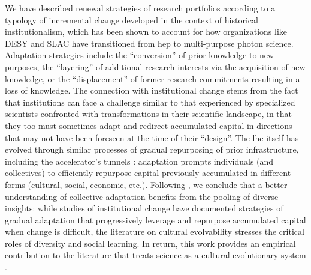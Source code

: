 \documentclass{article}
\begin{document}
We have described renewal strategies of research portfolios according to a typology of incremental change developed in the context of historical institutionalism, which has been shown to account for how organizations like DESY and SLAC have transitioned from \gls{hep} to multi-purpose photon science. Adaptation strategies include the ``conversion'' of prior knowledge to new purposes, the ``layering'' of additional research interests via the acquisition of new knowledge, or the ``displacement'' of former research commitments resulting in a loss of knowledge. The connection with institutional change stems from the fact that institutions can face a challenge similar to that experienced by specialized scientists confronted with transformations in their scientific landscape, in that they too must sometimes adapt and redirect accumulated capital in directions that may not have been foreseen at the time of their ``design''. The \gls{lhc} itself has evolved through similar processes of gradual repurposing of prior infrastructure, including the accelerator's tunnels \citep{Smith2015}: adaptation prompts individuals (and collectives) to efficiently repurpose capital previously accumulated in different forms (cultural, social, economic, etc.). Following \citealt{Galesic2023}, we conclude that a better understanding of collective adaptation benefits from the pooling of diverse insights: while studies of institutional change have documented strategies of gradual adaptation that progressively leverage and repurpose accumulated capital when change is difficult, the literature on cultural evolvability stresses the critical roles of diversity and social learning. In return, this work provides an empirical contribution to the literature that treats science as a cultural evolutionary system \citep{Wu2023}.
\end{document}
